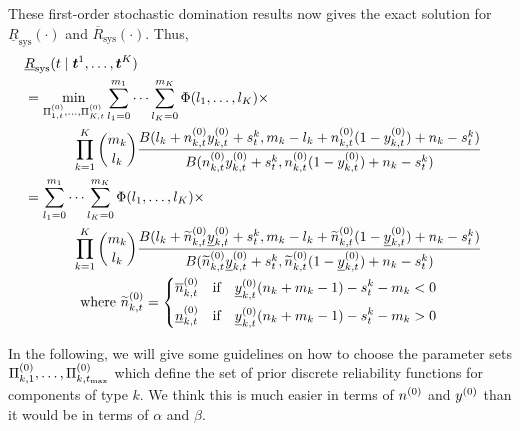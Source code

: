 \documentclass[12pt, a4paper]{elsarticle}
\newcommand{\bs}[1]{\boldsymbol{#1}}
\renewcommand{\vec}[1]{{\bs#1}}
\newcommand{\ul}[1]{\underline{#1}}
\newcommand{\ol}[1]{\overline{#1}}
\newcommand{\lRsys}{\ul{R}_\text{sys}}
\newcommand{\uRsys}{\ol{R}_\text{sys}}
\def\tmax{t_\text{max}}
\newcommand{\td}[1]{%
  \iftoggle{td}{%
    \todo[inline]{#1}%
  }{}%
}
\begin{document}
These first-order stochastic domination results now gives the exact 
solution for $\lRsys(\cdot)$ and $\uRsys(\cdot)$.  Thus,
\begin{align}
\lefteqn{\lRsys(t \mid \vec{t}^1, \ldots, \vec{t}^K)} \nonumber \\
 &= \min_{\PtZi{1}, \ldots, \PtZi{K}} 
    \sum_{l_1=0}^{m_1} \cdots \sum_{l_K=0}^{m_K} \Phi(l_1, \ldots, l_K) \times \nonumber \\ & \hspace*{8ex}
    \prod_{k=1}^K {m_k \choose l_k} \frac{B(l_k + \nktz\yktz + s^k_t, m_k - l_k + \nktz(1-\yktz) + n_k - s^k_t)}{B(\nktz\yktz + s^k_t, \nktz(1-\yktz) + n_k - s^k_t)}
    \nonumber\\
 &= \sum_{l_1=0}^{m_1} \cdots \sum_{l_K=0}^{m_K} \Phi(l_1, \ldots, l_K) \times \nonumber \\ & \hspace*{8ex}
    \prod_{k=1}^K {m_k \choose l_k} \frac{B(l_k + \nktzo\yktzl + s^k_t, m_k - l_k + \nktzo(1-\yktzl) + n_k - s^k_t)}{B(\nktzo\yktzl + s^k_t, \nktzo(1-\yktzl) + n_k - s^k_t)} \label{eq:LwrSysPost}\\
 &\qquad \qquad \mbox{where } \nktzo = \left\{ \begin{aligned}
   \nktzu & \quad\mbox{if}\quad \yktzl(n_k+m_k-1)-s^k_t-m_k < 0 \\
   \nktzl & \quad\mbox{if}\quad \yktzl(n_k+m_k-1)-s^k_t-m_k > 0 \\
 \end{aligned} \right. \nonumber
\end{align}

\td{*** Louis: I've edited to here so far, will continue editing rest of this section if we are happy with the above! ***}

In the following, we will give some guidelines on how to choose the parameter sets $\PkZi{1}, \ldots, \PkZi{\tmax}$
which define the set of prior discrete reliability functions for components of type $k$.
We think this is much easier in terms of $n^{(0)}$ and $y^{(0)}$ than it would be in terms of $\alpha$ and $\beta$.
\end{document}
